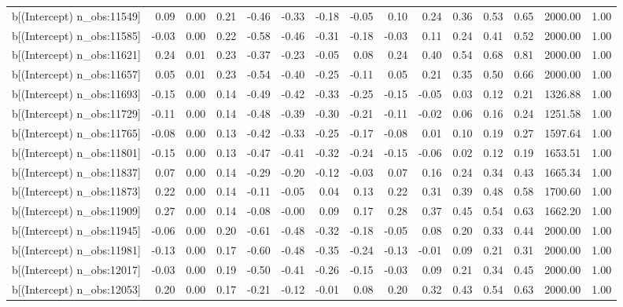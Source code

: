 \begin{table}[ht]
\begin{tabular}{rrrrrrrrrrrrrrr}
  b[(Intercept) n\_obs:11549] & 0.09 & 0.00 & 0.21 & -0.46 & -0.33 & -0.18 & -0.05 & 0.10 & 0.24 & 0.36 & 0.53 & 0.65 & 2000.00 & 1.00 \\ 
  b[(Intercept) n\_obs:11585] & -0.03 & 0.00 & 0.22 & -0.58 & -0.46 & -0.31 & -0.18 & -0.03 & 0.11 & 0.24 & 0.41 & 0.52 & 2000.00 & 1.00 \\ 
  b[(Intercept) n\_obs:11621] & 0.24 & 0.01 & 0.23 & -0.37 & -0.23 & -0.05 & 0.08 & 0.24 & 0.40 & 0.54 & 0.68 & 0.81 & 2000.00 & 1.00 \\ 
  b[(Intercept) n\_obs:11657] & 0.05 & 0.01 & 0.23 & -0.54 & -0.40 & -0.25 & -0.11 & 0.05 & 0.21 & 0.35 & 0.50 & 0.66 & 2000.00 & 1.00 \\ 
  b[(Intercept) n\_obs:11693] & -0.15 & 0.00 & 0.14 & -0.49 & -0.42 & -0.33 & -0.25 & -0.15 & -0.05 & 0.03 & 0.12 & 0.21 & 1326.88 & 1.00 \\ 
  b[(Intercept) n\_obs:11729] & -0.11 & 0.00 & 0.14 & -0.48 & -0.39 & -0.30 & -0.21 & -0.11 & -0.02 & 0.06 & 0.16 & 0.24 & 1251.58 & 1.00 \\ 
  b[(Intercept) n\_obs:11765] & -0.08 & 0.00 & 0.13 & -0.42 & -0.33 & -0.25 & -0.17 & -0.08 & 0.01 & 0.10 & 0.19 & 0.27 & 1597.64 & 1.00 \\ 
  b[(Intercept) n\_obs:11801] & -0.15 & 0.00 & 0.13 & -0.47 & -0.41 & -0.32 & -0.24 & -0.15 & -0.06 & 0.02 & 0.12 & 0.19 & 1653.51 & 1.00 \\ 
  b[(Intercept) n\_obs:11837] & 0.07 & 0.00 & 0.14 & -0.29 & -0.20 & -0.12 & -0.03 & 0.07 & 0.16 & 0.24 & 0.34 & 0.43 & 1665.34 & 1.00 \\ 
  b[(Intercept) n\_obs:11873] & 0.22 & 0.00 & 0.14 & -0.11 & -0.05 & 0.04 & 0.13 & 0.22 & 0.31 & 0.39 & 0.48 & 0.58 & 1700.60 & 1.00 \\ 
  b[(Intercept) n\_obs:11909] & 0.27 & 0.00 & 0.14 & -0.08 & -0.00 & 0.09 & 0.17 & 0.28 & 0.37 & 0.45 & 0.54 & 0.63 & 1662.20 & 1.00 \\ 
  b[(Intercept) n\_obs:11945] & -0.06 & 0.00 & 0.20 & -0.61 & -0.48 & -0.32 & -0.18 & -0.05 & 0.08 & 0.20 & 0.33 & 0.44 & 2000.00 & 1.00 \\ 
  b[(Intercept) n\_obs:11981] & -0.13 & 0.00 & 0.17 & -0.60 & -0.48 & -0.35 & -0.24 & -0.13 & -0.01 & 0.09 & 0.21 & 0.31 & 2000.00 & 1.00 \\ 
  b[(Intercept) n\_obs:12017] & -0.03 & 0.00 & 0.19 & -0.50 & -0.41 & -0.26 & -0.15 & -0.03 & 0.09 & 0.21 & 0.34 & 0.45 & 2000.00 & 1.00 \\ 
  b[(Intercept) n\_obs:12053] & 0.20 & 0.00 & 0.17 & -0.21 & -0.12 & -0.01 & 0.08 & 0.20 & 0.32 & 0.43 & 0.54 & 0.63 & 2000.00 & 1.00 \\ 

\end{tabular}
\end{table}
